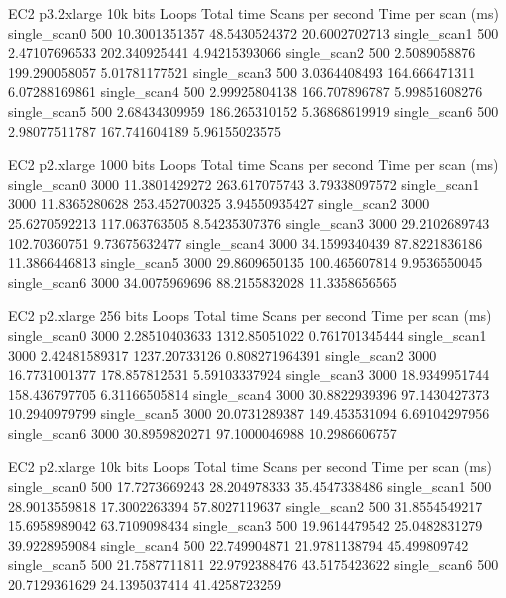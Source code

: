 EC2 p3.2xlarge 10k bits
Loops	Total time	Scans per second	Time per scan (ms)
single\_scan0	500	10.3001351357	48.5430524372	20.6002702713
single\_scan1	500	2.47107696533	202.340925441	4.94215393066
single\_scan2	500	2.5089058876	199.290058057	5.01781177521
single\_scan3	500	3.0364408493	164.666471311	6.07288169861
single\_scan4	500	2.99925804138	166.707896787	5.99851608276
single\_scan5	500	2.68434309959	186.265310152	5.36868619919
single\_scan6	500	2.98077511787	167.741604189	5.96155023575


EC2 p2.xlarge 1000 bits
Loops	Total time	Scans per second	Time per scan (ms)
single\_scan0	3000	11.3801429272	263.617075743	3.79338097572
single\_scan1	3000	11.8365280628	253.452700325	3.94550935427
single\_scan2	3000	25.6270592213	117.063763505	8.54235307376
single\_scan3	3000	29.2102689743	102.70360751	9.73675632477
single\_scan4	3000	34.1599340439	87.8221836186	11.3866446813
single\_scan5	3000	29.8609650135	100.465607814	9.9536550045
single\_scan6	3000	34.0075969696	88.2155832028	11.3358656565


EC2 p2.xlarge 256 bits
Loops	Total time	Scans per second	Time per scan (ms)
single\_scan0	3000	2.28510403633	1312.85051022	0.761701345444
single\_scan1	3000	2.42481589317	1237.20733126	0.808271964391
single\_scan2	3000	16.7731001377	178.857812531	5.59103337924
single\_scan3	3000	18.9349951744	158.436797705	6.31166505814
single\_scan4	3000	30.8822939396	97.1430427373	10.2940979799
single\_scan5	3000	20.0731289387	149.453531094	6.69104297956
single\_scan6	3000	30.8959820271	97.1000046988	10.2986606757



EC2 p2.xlarge 10k bits
Loops	Total time	Scans per second	Time per scan (ms)
single\_scan0	500	17.7273669243	28.204978333	35.4547338486
single\_scan1	500	28.9013559818	17.3002263394	57.8027119637
single\_scan2	500	31.8554549217	15.6958989042	63.7109098434
single\_scan3	500	19.9614479542	25.0482831279	39.9228959084
single\_scan4	500	22.749904871	21.9781138794	45.499809742
single\_scan5	500	21.7587711811	22.9792388476	43.5175423622
single\_scan6	500	20.7129361629	24.1395037414	41.4258723259




